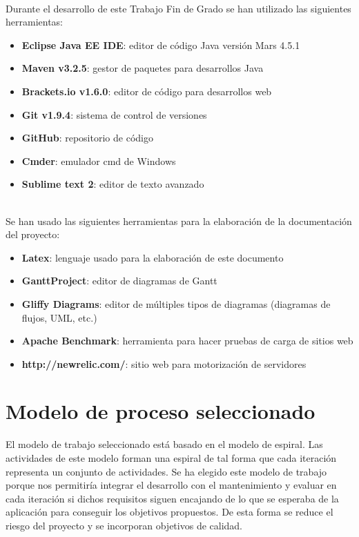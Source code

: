\newpage       
{}\\

Durante el desarrollo de este Trabajo Fin de Grado se han utilizado las siguientes herramientas:

\begin{itemize}
       \item {\bfseries Eclipse Java EE IDE}: editor de código Java versión Mars 4.5.1
       \item {\bfseries Maven v3.2.5}: gestor de paquetes para desarrollos Java
       \item {\bfseries Brackets.io v1.6.0}: editor de código para desarrollos web
       \item {\bfseries Git v1.9.4}: sistema de control de versiones
       \item {\bfseries GitHub}: repositorio de código
       \item {\bfseries Cmder}: emulador cmd de Windows 
       \item {\bfseries Sublime text 2}: editor de texto avanzado
\end{itemize}

\\

Se han usado las siguientes herramientas para la elaboración de la documentación del proyecto:

\begin{itemize}
       \item {\bfseries Latex}: lenguaje usado para la elaboración de este documento
       \item {\bfseries GanttProject}: editor de diagramas de Gantt
       \item {\bfseries Gliffy Diagrams}: editor de múltiples tipos de diagramas (diagramas de flujos, UML, etc.)
       \item {\bfseries Apache Benchmark}: herramienta para hacer pruebas de carga de sitios web
       \item {\bfseries http://newrelic.com/}: sitio web para motorización de servidores
\end{itemize}


\section{Modelo de proceso seleccionado}

El modelo de trabajo seleccionado está basado en el modelo de espiral. Las actividades de este modelo forman una espiral de tal forma que cada iteración representa un conjunto de actividades. Se ha elegido este modelo de trabajo porque nos permitiría integrar el desarrollo con el mantenimiento y evaluar en cada iteración si dichos requisitos siguen encajando de lo que se esperaba de la aplicación para conseguir los objetivos propuestos. De esta forma se reduce el riesgo del proyecto y se incorporan objetivos de calidad.

